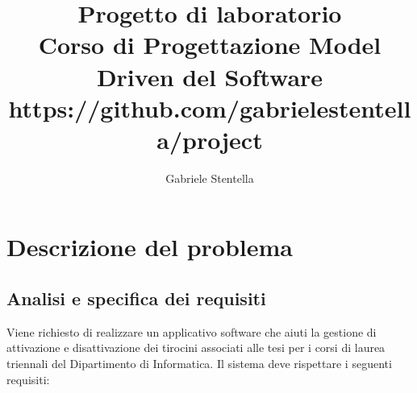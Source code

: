 \documentclass[12pt]{article}
\title{Progetto di laboratorio \\
\large{Corso di Progettazione Model Driven del Software} \\
\small{https://github.com/gabrielestentella/project}}
\author{Gabriele Stentella}
\date{}
\begin{document}
\maketitle
\section{Descrizione del problema}
\label{sec:descprob}

\subsection{Analisi e specifica dei requisiti}

Viene richiesto di realizzare un applicativo software che aiuti la gestione di attivazione e disattivazione dei tirocini associati alle tesi per i corsi di laurea triennali del Dipartimento di Informatica. Il sistema deve rispettare i seguenti requisiti:
\end{document}
